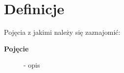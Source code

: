 \part*{Definicje}
	Pojęcia z jakimi należy się zaznajomić:
	\begin{description}
	
		\item[\textbf{Pojęcie}] - opis

	\end{description}
